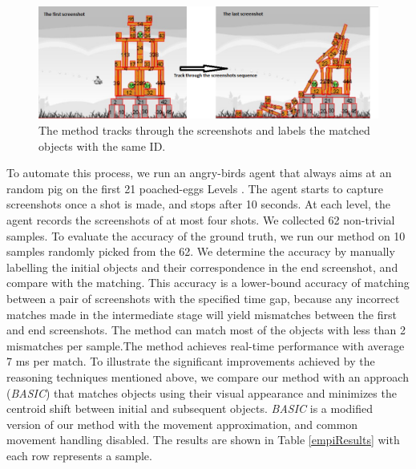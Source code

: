 \documentclass[letterpaper]{article}
\begin{document}
\begin{figure}[t]
\centering\includegraphics[scale=0.25]{TrackingBackup.png}\caption{The method tracks through the screenshots and labels the matched objects with the same ID.} %
\label{Tracking}
\vspace{-5mm}
\end{figure}

To automate this process, we run an angry-birds agent that always aims at an random pig on the first 21 poached-eggs Levels \cite{abGame}. The agent starts to capture screenshots once a shot is made, and stops after 10 seconds. At each level, the agent records the screenshots of at most four shots. We collected 62 non-trivial samples. To evaluate the accuracy of the ground truth, we run our method on 10 samples randomly picked from the 62. We determine the accuracy by manually labelling the initial objects and their correspondence in the end screenshot, and compare with the matching. This accuracy is a lower-bound accuracy of matching between a pair of screenshots with the specified time gap, because any incorrect matches made in the intermediate stage will yield mismatches between the first and end screenshots.  
The method can match most of the objects with less than 2 mismatches per sample.The method achieves real-time performance with average 7 ms per match. To illustrate the significant improvements achieved by the reasoning techniques mentioned above, we compare our method with an approach (\emph{BASIC}) that matches objects using their visual appearance and minimizes the centroid shift between initial and subsequent objects. \emph{BASIC} is a modified version of our method with the movement approximation, and common movement handling disabled. The results are shown in Table \ref{empiResults} with each row represents a sample.
\end{document}
